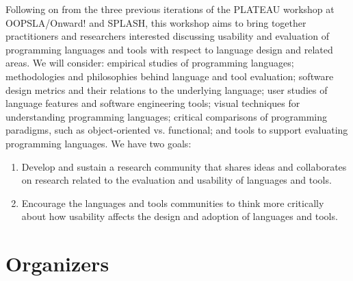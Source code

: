 \documentclass{sigplanconf}
\begin{document}
Following on from the three previous iterations of the PLATEAU workshop at OOPSLA/Onward! 
and SPLASH, this workshop aims to bring together practitioners and
researchers interested discussing usability and evaluation of
programming languages and tools with respect to language design and
related areas. We will consider: empirical studies of programming
languages; methodologies and philosophies behind language and tool
evaluation; software design metrics and their relations to the
underlying language; user studies of language features and software
engineering tools; visual techniques for understanding programming
languages; critical comparisons of programming paradigms, such as
object-oriented vs. functional; and tools to support evaluating
programming languages. We have two goals:

\begin{enumerate}
  \item 
Develop and sustain a research community that shares ideas and collaborates on 
research related to the evaluation and usability of languages and tools.
\item
Encourage the languages and tools communities to think more critically
about how usability affects the  design and adoption of languages and tools.
\end{enumerate}


\section{Organizers}
\end{document}
